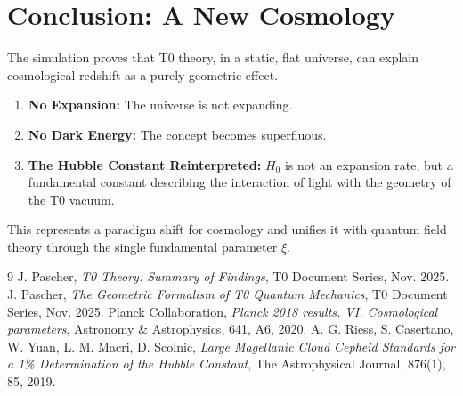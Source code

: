 	\section{Conclusion: A New Cosmology}
	The simulation proves that T0 theory, in a static, flat universe, can explain cosmological redshift as a purely geometric effect.
	\begin{enumerate}
		\item \textbf{No Expansion:} The universe is not expanding.
		\item \textbf{No Dark Energy:} The concept becomes superfluous.
		\item \textbf{The Hubble Constant Reinterpreted:} $H_0$ is not an expansion rate, but a fundamental constant describing the interaction of light with the geometry of the T0 vacuum.
	\end{enumerate}
	This represents a paradigm shift for cosmology and unifies it with quantum field theory through the single fundamental parameter $\xi$.
	\begin{thebibliography}{9}
		J. Pascher, \textit{T0 Theory: Summary of Findings}, T0 Document Series, Nov. 2025.
		J. Pascher, \textit{The Geometric Formalism of T0 Quantum Mechanics}, T0 Document Series, Nov. 2025.
		Planck Collaboration, \textit{Planck 2018 results. VI. Cosmological parameters}, Astronomy \& Astrophysics, 641, A6, 2020.
		A. G. Riess, S. Casertano, W. Yuan, L. M. Macri, D. Scolnic, \textit{Large Magellanic Cloud Cepheid Standards for a 1\% Determination of the Hubble Constant}, The Astrophysical Journal, 876(1), 85, 2019.
	\end{thebibliography}
